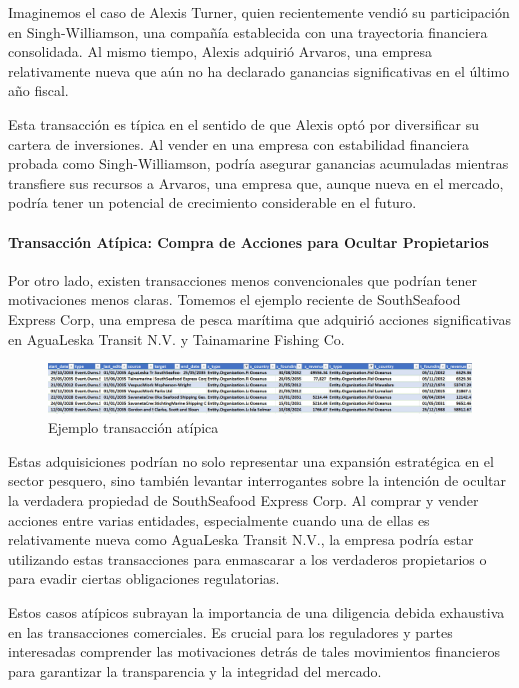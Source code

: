 \documentclass[11pt,spanish,a4paper]{article}
\begin{document}
Imaginemos el caso de Alexis Turner, quien recientemente vendió su participación en Singh-Williamson, una compañía establecida con una trayectoria financiera consolidada. Al mismo tiempo, Alexis adquirió Arvaros, una empresa relativamente nueva que aún no ha declarado ganancias significativas en el último año fiscal.

Esta transacción es típica en el sentido de que Alexis optó por diversificar su cartera de inversiones. Al vender en una empresa con estabilidad financiera probada como Singh-Williamson, podría asegurar ganancias acumuladas mientras transfiere sus recursos a Arvaros, una empresa que, aunque nueva en el mercado, podría tener un potencial de crecimiento considerable en el futuro.

\paragraph{Transacción Atípica: Compra de Acciones para Ocultar Propietarios}
Por otro lado, existen transacciones menos convencionales que podrían tener motivaciones menos claras. Tomemos el ejemplo reciente de SouthSeafood Express Corp, una empresa de pesca marítima que adquirió acciones significativas en AguaLeska Transit N.V. y Tainamarine Fishing Co.

\begin{figure}[H]
    \centering
    \includegraphics[width=1\linewidth]{graphs/ejercicio_2_2.png}
    \caption{Ejemplo transacción atípica}
    \label{fig:enter-label5}
\end{figure}

Estas adquisiciones podrían no solo representar una expansión estratégica en el sector pesquero, sino también levantar interrogantes sobre la intención de ocultar la verdadera propiedad de SouthSeafood Express Corp. Al comprar y vender acciones entre varias entidades, especialmente cuando una de ellas es relativamente nueva como AguaLeska Transit N.V., la empresa podría estar utilizando estas transacciones para enmascarar a los verdaderos propietarios o para evadir ciertas obligaciones regulatorias.

Estos casos atípicos subrayan la importancia de una diligencia debida exhaustiva en las transacciones comerciales. Es crucial para los reguladores y partes interesadas comprender las motivaciones detrás de tales movimientos financieros para garantizar la transparencia y la integridad del mercado.
\end{document}
